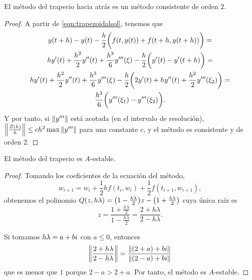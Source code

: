 \begin{proposition}
    El método del trapecio hacia atrás es un método consistente de orden $2$.

\begin{proof}
    A partir de \eqref{eqn:trapezoidalsol}, tenemos que 
    \begin{multline*}
        y(t+h) - y(t) - \frac{h}{2}\qty\bigg(f(t, y(t)) + f(t+h, y(t+h))) = \\
        hy'(t) + \frac{h^2}{2}y''(t) + \frac{h^3}{6}y'''(\xi)
        - \frac{h}{2}\qty\bigg(y'(t) - y'(t+h)) = \\
        hy'(t) + \frac{h^2}{2}y''(t) + \frac{h^3}{6}y'''(\xi)
        - \frac{h}{2}\qty\bigg(2y'(t) + hy''(t) + \frac{h^2}{2}y'''(\xi_2)) = \\
        \frac{h^3}{6}\qty\bigg(y'''(\xi_1) - y'''(\xi_2)).
    \end{multline*}
    Y por tanto, si $\norm{y'''}$ está acotada (en el intervalo de resolución),
    $\norm{\frac{Z(h)}{h}} \le ch^2\max{\norm{y'''}}$
    para una constante $c$,
    y el método es consistente y de orden $2$.
\end{proof}
\end{proposition}

\begin{proposition}
    El método del trapecio es $A$-estable.

\begin{proof}
    Tomando los coeficientes de la ecuación del método,
    \begin{equation*}
        w_{i+1} = w_i + \frac{1}{2}hf(t_i, w_i) + \frac{1}{2}f(t_{i+1}, w_{i+1}),
    \end{equation*}
    obtenemos el polinomio
    $Q(z, h\lambda) = \qty(1 - \frac{h\lambda}{2})z - \qty(1 + \frac{h\lambda}{2})$
    cuya única raíz es
    \begin{equation*}
        z = \frac{1 + \frac{h\lambda}{2}}{1 - \frac{h\lambda}{2}} =
        \frac{2 + h\lambda}{2 - h\lambda}.
    \end{equation*}

    Si tomamos $h\lambda = a + bi$ con $a \le 0$, entonces
    \begin{equation*}
        \norm{\frac{2 + h\lambda}{2 - h\lambda}} =
        \frac{\norm{(2+a) + bi}}{\norm{(2-a) + bi}}
    \end{equation*}
    que es menor que $1$ porque $2 - a > 2 + a$.
    Por tanto, el método es $A$-estable.
\end{proof}
\end{proposition}

